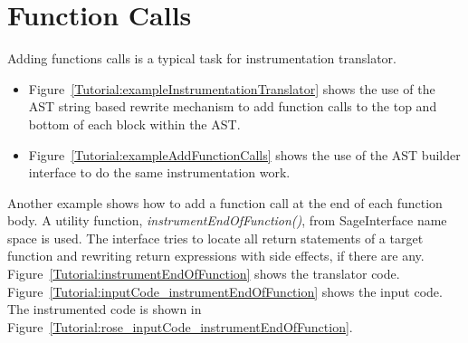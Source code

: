 \section{Function Calls}
Adding functions calls is a typical task for instrumentation translator. 
\begin{itemize}
\item Figure~\ref{Tutorial:exampleInstrumentationTranslator} shows the use of
the AST string based rewrite mechanism to add function calls to the top and bottom of 
each block within the AST.

\item Figure~\ref{Tutorial:exampleAddFunctionCalls} shows the use of
the AST builder interface to do the same instrumentation work.
\end{itemize}

Another example shows how to add a function call at the end of each
function body. A utility function, \textit{instrumentEndOfFunction()}, from SageInterface name space is used. 
The interface tries to locate all return statements of a target function 
 and rewriting return expressions with side effects, if there are any. 
 Figure~\ref{Tutorial:instrumentEndOfFunction} shows the translator code. 
 Figure~\ref{Tutorial:inputCode_instrumentEndOfFunction} shows the input
 code. The instrumented code is shown in
 Figure~\ref{Tutorial:rose_inputCode_instrumentEndOfFunction}.

